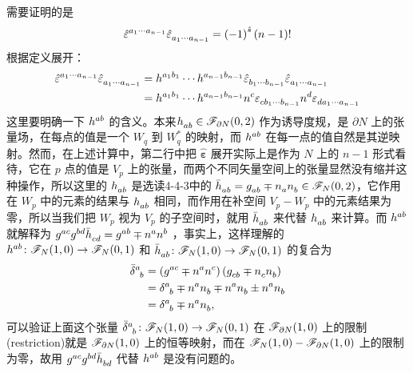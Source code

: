 \begin{xiti}
	\begin{zm}
		需要证明的是
		\begin{displaymath}
		\tensor{\hat{\varepsilon}}{^{a_1 \cdots a_{n-1} }} \tensor{\hat{\varepsilon}}{_{ a_1 \cdots a_{n-1} }} = \left(-1\right)^{\hat{s}} \left(n-1\right)!
		\end{displaymath}
		根据定义展开：
		\begin{align*}
		\tensor{\hat{\varepsilon}}{^{a_1 \cdots a_{n-1} }} \tensor{\hat{\varepsilon}}{_{ a_1 \cdots a_{n-1} }} &= \tensor{h}{^{a_1 b_1}} \cdots \tensor{h}{^{a_{n-1} b_{n-1} }} \tensor{\hat{\varepsilon}}{_{b_1 \cdots b_{n-1} }} \tensor{\hat{\varepsilon}}{_{ a_1 \cdots a_{n-1} }}\\
		&= \tensor{h}{^{a_1 b_1}} \cdots \tensor{h}{^{a_{n-1} b_{n-1} }} \tensor{n}{^c} \tensor{\varepsilon}{_{c b_1 \cdots b_{n-1} }} \tensor{n}{^d} \tensor{\varepsilon}{_{ d a_1 \cdots a_{n-1} }}
		\end{align*}
		这里要明确一下 $\tensor{h}{^a^b}$ 的含义。本来$\tensor{h}{_a_b} \in \F_{\partial N}(0,2)$ 作为诱导度规，是 $\partial N$ 上的张量场，在每点的值是一个 $W_q $ 到 $W_q^* $ 的映射，而 $\tensor{h}{^a^b}$ 在每一点的值自然是其逆映射。然而，在上述计算中，第二行中把 $\bm{\hat{\varepsilon}}$ 展开实际上是作为 $N$ 上的 $n-1$ 形式看待，它在 $p$ 点的值是 $V_p$ 上的张量，而两个不同矢量空间上的张量显然没有缩并这种操作，所以这里的 $\tensor{h}{_a_b}$ 是选读4-4-3中的 $\tensor{\bar{h}}{_a_b} = \tensor{g}{_a_b} \mp \tensor{n}{_a} \tensor{n}{_b} \in \F_N(0,2) $，它作用在 $W_p$ 中的元素的结果与 $\tensor{h}{_a_b}$ 相同，而作用在补空间 $V_p-W_p$ 中的元素结果为零，所以当我们把 $W_p$ 视为 $V_p$ 的子空间时，就用 $\tensor{\bar{h}}{_a_b}$ 来代替 $\tensor{h}{_a_b}$ 来计算。而 $\tensor{h}{^a^b}$ 就解释为 $\tensor{g}{^a^c} \tensor{g}{^b^d} \tensor{\bar{h}}{_c_d} = \tensor{g}{^a^b} \mp \tensor{n}{^a} \tensor{n}{^b}$ ，事实上，这样理解的 $\tensor{h}{^a^b} \colon \F_N (1,0) \rightarrow \F_N(0,1) $ 和 $\tensor{\bar{h}}{_a_b} \colon \F_N (1,0) \rightarrow \F_N (0,1) $ 的复合为
		\begin{align*}
		\tensor{\bar{\delta}}{^a_b} &= \left( \tensor{g}{^a^c} \mp \tensor{n}{^a} \tensor{n}{^c} \right) \left( \tensor{g}{_c_b} \mp \tensor{n}{_c} \tensor{n}{_b} \right)\\
		&= \tensor{\delta}{^a_b} \mp \tensor{n}{^a} \tensor{n}{_b} \mp \tensor{n}{^a} \tensor{n}{_b} \pm \tensor{n}{^a} \tensor{n}{_b}\\
		&= \tensor{\delta}{^a_b} \mp \tensor{n}{^a} \tensor{n}{_b},
		\end{align*}
		可以验证上面这个张量 $\tensor{\bar{\delta}}{^a_b} \colon \F_N(1,0) \rightarrow \F_N(0,1) $ 在 $\mathscr{F}_{\partial N}(1,0) $ 上的限制(restriction)就是 $\mathscr{F}_{\partial N}(1,0) $ 上的恒等映射，而在 $\mathscr{F}_N(1,0) - \mathscr{F}_{\partial N}(1,0) $ 上的限制为零，故用 $\tensor{g}{^a^c} \tensor{g}{^b^d} \tensor{\bar{h}}{_b_d}$ 代替 $\tensor{h}{^a^b}$ 是没有问题的。
		

\end{zm}
\end{xiti}
